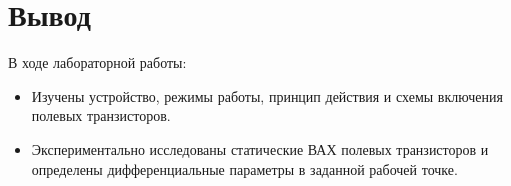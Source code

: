 \section{Вывод}
В ходе лабораторной работы:
\begin{itemize}
\item
  Изучены устройство, режимы работы, принцип действия и схемы включения полевых транзисторов.
\item
  Экспериментально исследованы статические ВАХ полевых транзисторов и определены дифференциальные параметры в заданной рабочей точке.

\end{itemize}
\clearpage
